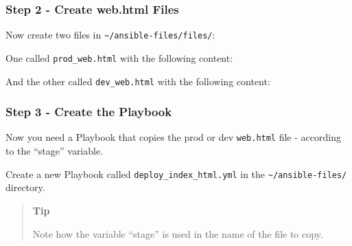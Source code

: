 \hypertarget{step-2---create-web.html-files}{%
\subsubsection{Step 2 - Create web.html
Files}\label{step-2---create-web.html-files}}

Now create two files in \texttt{\textasciitilde{}/ansible-files/files/}:

One called \texttt{prod\_web.html} with the following content:

\begin{Shaded}
\begin{Highlighting}[]
\DataTypeTok{\textless{}}\DataTypeTok{\textgreater{}}
\DataTypeTok{  \textless{}}\DataTypeTok{\textgreater{}}\DataTypeTok{\textless{}/}\DataTypeTok{\textgreater{}}
\DataTypeTok{\textless{}/}\DataTypeTok{\textgreater{}}
\end{Highlighting}
\end{Shaded}

And the other called \texttt{dev\_web.html} with the following content:

\begin{Shaded}
\begin{Highlighting}[]
\DataTypeTok{\textless{}}\DataTypeTok{\textgreater{}}
\DataTypeTok{  \textless{}}\DataTypeTok{\textgreater{}}\DataTypeTok{\textless{}/}\DataTypeTok{\textgreater{}}
\DataTypeTok{\textless{}/}\DataTypeTok{\textgreater{}}
\end{Highlighting}
\end{Shaded}

\hypertarget{step-3---create-the-playbook}{%
\subsubsection{Step 3 - Create the
Playbook}\label{step-3---create-the-playbook}}

Now you need a Playbook that copies the prod or dev \texttt{web.html}
file - according to the ``stage'' variable.

Create a new Playbook called \texttt{deploy\_index\_html.yml} in the
\texttt{\textasciitilde{}/ansible-files/} directory.

\begin{quote}
\textbf{Tip}

Note how the variable ``stage'' is used in the name of the file to copy.
\end{quote}

